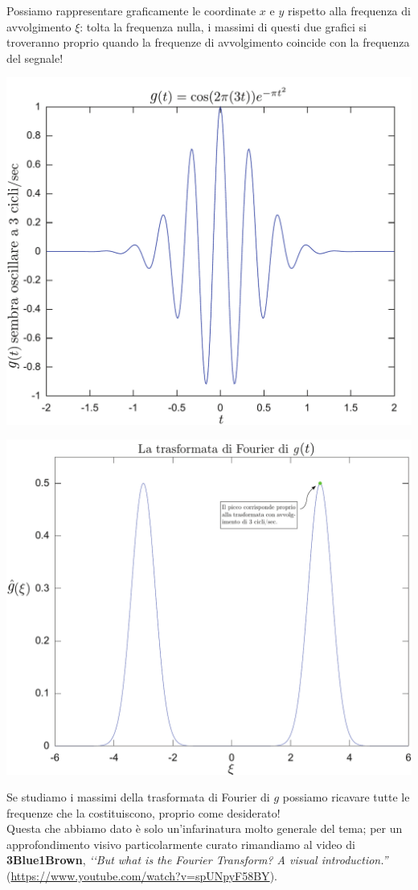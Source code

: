 Possiamo rappresentare graficamente le coordinate $x$ e $y$ rispetto alla frequenza di avvolgimento $\xi$: tolta la frequenza nulla, i massimi di questi due grafici si troveranno proprio quando la frequenze di avvolgimento coincide con la frequenza del segnale!
\begin{center}
	\includegraphics[trim=0cm 0cm 0cm 0cm, clip, scale=0.55]{images/fourier1.pdf}
\end{center}
\begin{center}
	\includegraphics[trim=0cm 0cm 0cm 0cm, clip, scale=0.55]{images/fourier2.pdf}
\end{center}
Se studiamo i massimi della trasformata di Fourier di $g$ possiamo ricavare tutte le frequenze che la costituiscono, proprio come desiderato!\\
Questa che abbiamo dato è solo un'infarinatura molto generale del tema; per un approfondimento visivo particolarmente curato rimandiamo al video di \textbf{3Blue1Brown}, 	\textit{‘‘But what is the Fourier Transform?  A visual introduction.''} (\textcolor{redill}{\url{https://www.youtube.com/watch?v=spUNpyF58BY}}).
